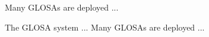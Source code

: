     Many \acp{GLOSA} are deployed ...

     The \ac{GLOSA} system ...
    Many \acp{GLOSA} are deployed ...

    
    
